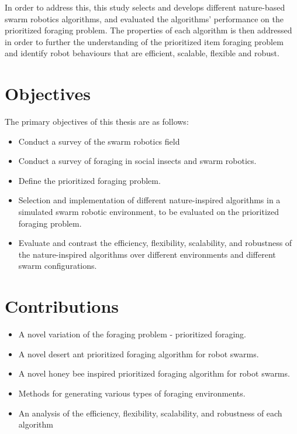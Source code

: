 In order to address this, this study selects and develops different nature-based swarm robotics algorithms, and evaluated the algorithms' performance on the prioritized foraging problem. The properties of each algorithm is then addressed in order to further the understanding of the prioritized item foraging problem and identify robot behaviours that are efficient, scalable, flexible and robust.


\section{Objectives}
\label{sec:introduction:objectives}

The primary objectives of this thesis are as follows:

\begin{itemize}
	\item Conduct a survey of the swarm robotics field
	\item Conduct a survey of foraging in social insects and  swarm robotics.
	\item Define the prioritized foraging problem.
	\item Selection and implementation of different nature-inspired algorithms in a simulated swarm robotic environment, to be evaluated on the prioritized foraging problem.
	\item Evaluate and contrast the efficiency, flexibility, scalability, and robustness of the nature-inspired algorithms over different environments and different swarm configurations.
\end{itemize}



\section{Contributions}
\label{sec:introduction:contributions}

\begin{itemize}
	\item A novel variation of the foraging problem - prioritized foraging.
	\item A novel desert ant prioritized foraging algorithm for robot swarms.
	\item A novel honey bee inspired prioritized foraging algorithm for robot swarms.
	\item Methods for generating various types of foraging environments.
	\item An analysis of the efficiency, flexibility, scalability, and robustness of each algorithm  
\end{itemize}


